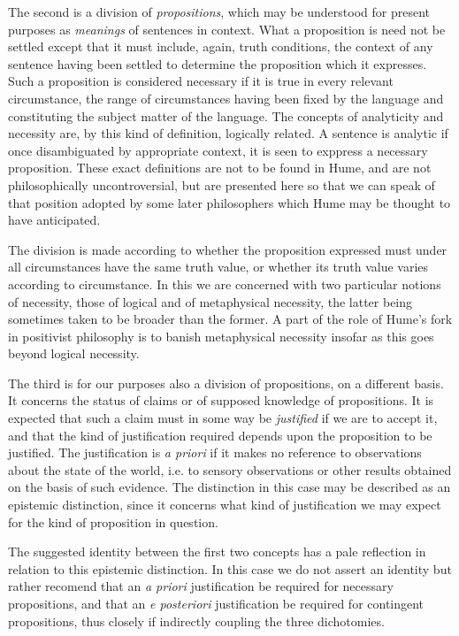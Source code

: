 The second is a division of {\it propositions}, which may be
understood for present purposes as {\it meanings} of sentences in
context.
What a proposition is need not be settled except that it must include, again, truth conditions, the context of any sentence having been settled to determine the proposition which it expresses.
Such a proposition is considered necessary if it is true in every relevant circumstance, the range of circumstances having been fixed by the language and constituting the subject matter of the language.
The concepts of analyticity and necessity are, by this kind of definition, logically related.
A sentence is analytic if once disambiguated by appropriate context, it is seen to exppress a necessary proposition.
These exact definitions are not to be found in Hume, and are not philosophically uncontroversial, but are presented here so that we can speak of that position adopted by some later philosophers which Hume may be thought to have anticipated.

The division is made according to whether the proposition
expressed must under all circumstances have the same truth value, or
whether its truth value varies according to circumstance.
In this we are concerned with two particular notions of necessity,
those of logical and of metaphysical necessity, the latter being
sometimes taken to be broader than the former.
A part of the role of Hume's fork in positivist philosophy is to
banish metaphysical necessity insofar as this goes beyond logical necessity.

The third is for our purposes also a division of propositions, on a
different basis.
It concerns the status of claims or of supposed knowledge of
propositions.
It is expected that such a claim must in some way be
{\it justified} if we are to accept it, and that the kind of
justification required depends upon the proposition to be justified.
The justification is \emph{a priori} if it makes no reference to observations
about the state of the world, i.e. to sensory observations or other results obtained on the basis of such evidence.
The distinction in this case may be described as an epistemic distinction, since it concerns what kind of justification we may expect for the kind of proposition in question.

The suggested identity between the first two concepts has a pale reflection in relation to this epistemic distinction.
In this case we do not assert an identity but rather recomend that an \emph{a priori} justification be required for necessary propositions, and that an \emph{e posteriori} justification be required for contingent propositions, thus closely if indirectly coupling the three dichotomies.

